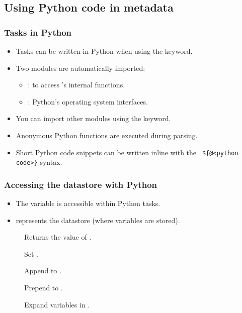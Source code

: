 \subsection{Using Python code in metadata}

\begin{frame}
  \frametitle{Tasks in Python}
  \begin{itemize}
    \item Tasks can be written in Python when using the 
      keyword.
    \item Two modules are automatically imported:
      \begin{itemize}
        \item {}: to access 's internal functions.
        \item {}: Python's operating system interfaces.
      \end{itemize}
    \item You can import other modules using the 
      keyword.
    \item Anonymous Python functions are executed during parsing.
      \item Short Python code snippets can be written inline with the {\tt
        \$\{@<python code>\}} syntax.
  \end{itemize}
\end{frame}

\begin{frame}
  \frametitle{Accessing the datastore with Python}
  \begin{itemize}
    \item The  variable is accessible within Python tasks.
    \item {} represents the  datastore (where variables are
      stored).
  \end{itemize}
  \begin{description}
    \item[] Returns the value of
      .
    \item[] Set .
    \item[] Append  to
      .
    \item[] Prepend  to
      .
    \item[] Expand variables in
      .
  \end{description}
\end{frame}

